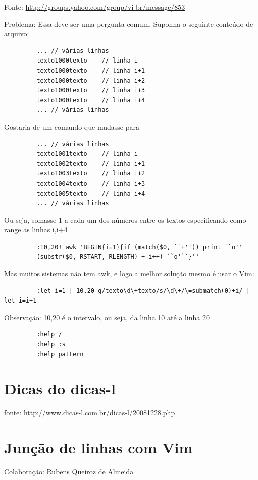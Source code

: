 \documentclass[10pt,a4paper,openany]{book}
\begin{document}
 Fonte: \url{http://groups.yahoo.com/group/vi-br/message/853}

 Problema:
 Essa deve ser uma pergunta comum.
 Suponha o seguinte conteúdo de arquivo:

\begin{verbatim}
		 ... // várias linhas
		 texto1000texto    // linha i
		 texto1000texto    // linha i+1
		 texto1000texto    // linha i+2
		 texto1000texto    // linha i+3
		 texto1000texto    // linha i+4
		 ... // várias linhas
\end{verbatim}

Gostaria de um comando que mudasse para

\begin{verbatim}
		 ... // várias linhas
		 texto1001texto    // linha i
		 texto1002texto    // linha i+1
		 texto1003texto    // linha i+2
		 texto1004texto    // linha i+3
		 texto1005texto    // linha i+4
		 ... // várias linhas
\end{verbatim}

 Ou seja, somasse 1 a cada um dos números entre os textos
 especificando como range as linhas i,i+4

\begin{verbatim}
		 :10,20! awk 'BEGIN{i=1}{if (match($0, ``+'')) print ``o''
		 (substr($0, RSTART, RLENGTH) + i++) ``o'``}''
\end{verbatim}

 Mas muitos sistemas não tem awk, e logo a melhor solução mesmo é usar o Vim:

\begin{verbatim}
		 :let i=1 | 10,20 g/texto\d\+texto/s/\d\+/\=submatch(0)+i/ | let i=i+1
\end{verbatim}

Observação: 10,20 é o intervalo, ou seja, da linha 10 até a linha 20

\begin{verbatim}
		 :help /
		 :help :s
		 :help pattern
\end{verbatim}

\section{Dicas do dicas-l}

fonte: \url{http://www.dicas-l.com.br/dicas-l/20081228.php}

\section{Junção de linhas com Vim}
\label{Junção de linhas com Vim}
Colaboração: Rubens Queiroz de Almeida
\end{document}
